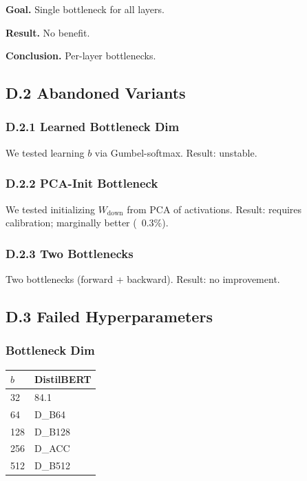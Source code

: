 \textbf{Goal.} Single bottleneck for all layers.

\textbf{Result.} No benefit.

\textbf{Conclusion.} Per-layer bottlenecks.

\subsection{D.2 Abandoned Variants}

\subsubsection{D.2.1 Learned Bottleneck Dim}

We tested learning $b$ via Gumbel-softmax. Result: unstable.

\subsubsection{D.2.2 PCA-Init Bottleneck}

We tested initializing $W_\text{down}$ from PCA of activations. Result: 
requires calibration; marginally better (~0.3\%).

\subsubsection{D.2.3 Two Bottlenecks}

Two bottlenecks (forward + backward). Result: no improvement.

\subsection{D.3 Failed Hyperparameters}

\subsubsection{Bottleneck Dim}

\begin{table}[H]
\centering
\small
\begin{tabular}{ll}
\toprule
\textbf{$b$} & \textbf{DistilBERT} \\
\midrule
32 & 84.1 \\
64 & {{D\_B64}} \\
128 & {{D\_B128}} \\
256 & {{D\_ACC}} \\
512 & {{D\_B512}} \\
\bottomrule
\end{tabular}
\end{table}

